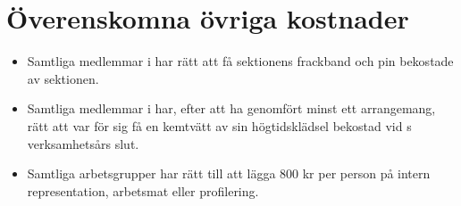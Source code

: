 \documentclass[11pt, includeaddress]{classes/cthit}
\begin{document}
\section{Överenskomna övriga kostnader}
\begin{itemize}
	\item Samtliga medlemmar i \FANBARERIT{} har rätt att få sektionens frackband och pin bekostade av sektionen.
	\item Samtliga medlemmar i \FANBARERIT{} har, efter att ha genomfört minst ett arrangemang, rätt att var för sig få en kemtvätt av sin högtidsklädsel bekostad vid \FANBARERIT{}s verksamhetsårs slut.
        \item Samtliga arbetsgrupper har rätt till att lägga 800 kr per person på
intern representation, arbetsmat eller profilering.
\end{itemize}
\end{document}
